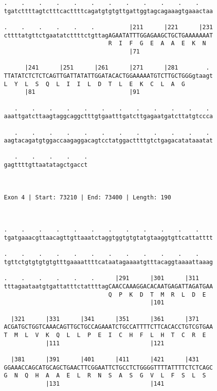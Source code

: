 \documentclass{article}
\begin{document}
\begin{Verbatim}
.    .    .    .    .    .    .    .    .    .    .    .    
tgatcttttagtctttcacttttcagatgtgtgttgattggtagcagaaagtgaaactaa
                                                            
.    .    .    .    .    .          |211      |221      |231
cttttatgttctgaatatcttttctgttagAGAATATTTGGAGAAGCTGCTGAAAAAAAT
                              R  I  F  G  E  A  A  E  K  N  
                                    |71                     
  
      |241      |251      |261      |271      |281        . 
TTATATCTCTCTCAGTTGATTATATTGGATACACTGGAAAAATGTCTTGCTGGGgtaagt
L  Y  L  S  Q  L  I  I  L  D  T  L  E  K  C  L  A  G        
      |81                           |91                     
  
   .    .    .    .    .    .    .    .    .    .    .    . 
aaattgatcttaagtaggcaggctttgtgaatttgatcttgagaatgatcttatgtccca
                                                            
   .    .    .    .    .    .    .    .    .    .    .    . 
aagtacagatgtggaccaagaggacagtcctatggacttttgtctgagacatataaatat
                                                            
   .    .    .    .    .
gagttttgttaatatagctgacct
                        
                        
 
Exon 4 | Start: 73210 | End: 73400 | Length: 190



.    .    .    .    .    .    .    .    .    .    .    .    
tgatgaaacgttaacagttgttaaatctaggtggtgtgtatgtaaggtgttcattatttt
                                                            
.    .    .    .    .    .    .    .    .    .    .    .    
tgttctgtgtgtgtgtttgaaaattttcataatagaaaatgtttacaggtaaaattaaag
                                                            
.    .    .    .    .    .      |291      |301      |311    
tttagaataatgtgattatttctattttagCAACCAAAGGACACAATGAGATTAGATGAA
                              Q  P  K  D  T  M  R  L  D  E  
                                          |101              
  
  |321      |331      |341      |351      |361      |371    
ACGATGCTGGTCAAACAGTTGCTGCCAGAAATCTGCCATTTTCTTCACACCTGTCGTGAA
T  M  L  V  K  Q  L  L  P  E  I  C  H  F  L  H  T  C  R  E  
            |111                          |121              
  
  |381      |391      |401      |411      |421      |431    
GGAAACCAGCATGCAGCTGAACTTCGGAATTCTGCCTCTGGGGTTTTATTTTCTCTCAGC
G  N  Q  H  A  A  E  L  R  N  S  A  S  G  V  L  F  S  L  S  
            |131                          |141              
  

\end{Verbatim}
\end{document}
